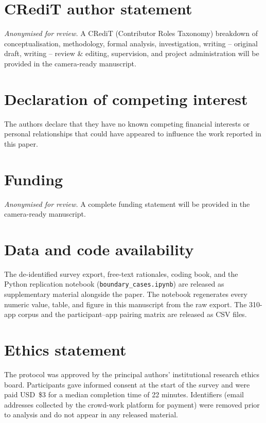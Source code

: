 \documentclass[11pt,a4paper]{article}
\makeatletter
\let\@oldsection\section
\renewcommand{\section}{\FloatBarrier\@oldsection}
\makeatother
\begin{document}
\section*{CRediT author statement}
\noindent\emph{Anonymised for review.} A CRediT
(Contributor Roles Taxonomy) breakdown of conceptualisation,
methodology, formal analysis, investigation, writing -- original
draft, writing -- review \& editing, supervision, and project
administration will be provided in the camera-ready manuscript.

\section*{Declaration of competing interest}
The authors declare that they have no known competing financial
interests or personal relationships that could have appeared to
influence the work reported in this paper.

\section*{Funding}
\emph{Anonymised for review.} A complete funding statement will be
provided in the camera-ready manuscript.

\section*{Data and code availability}
The de-identified survey export, free-text rationales, coding book,
and the Python replication notebook (\texttt{boundary\_cases.ipynb})
are released as supplementary material alongside the paper. The
notebook regenerates every numeric value, table, and figure in this
manuscript from the raw export. The 310-app corpus and the
participant--app pairing matrix are released as CSV files.

\section*{Ethics statement}
The protocol was approved by the principal authors' institutional
research ethics board. Participants gave informed consent at the
start of the survey and were paid USD~\$3 for a median completion
time of 22 minutes. Identifiers (email addresses collected by the
crowd-work platform for payment) were removed prior to analysis and
do not appear in any released material.
\end{document}
